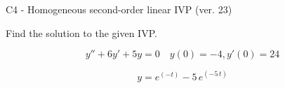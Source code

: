 \begin{exercise}
  \begin{exerciseTitle}C4 - Homogeneous second-order linear IVP (ver. 23)\end{exerciseTitle}
  \begin{exerciseStatement}
    
Find the solution to the given IVP.

    
\[y''+6y'+5y = 0 \hspace{1em} y(0) = -4 , y'(0) = 24\]

  \end{exerciseStatement}
  \begin{exerciseAnswer}
    
\[y= e^{\left(-t\right)} - 5 \, e^{\left(-5 \, t\right)}\]

  \end{exerciseAnswer}
\end{exercise}